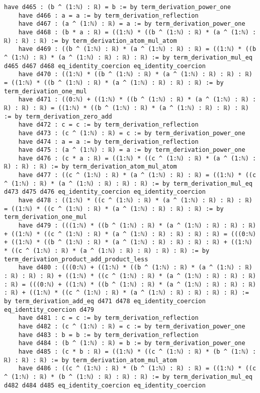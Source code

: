 \documentclass{article}
\begin{document}
\begin{tcolorbox}[colback=white!10, width=\linewidth]
\begin{lstlisting}[language=Lean4]
    have d465 : (b ^ (1:ℕ) : ℝ) = b := by term_derivation_power_one
    have d466 : a = a := by term_derivation_reflection
    have d467 : (a ^ (1:ℕ) : ℝ) = a := by term_derivation_power_one
    have d468 : (b * a : ℝ) = ((1:ℕ) * ((b ^ (1:ℕ) : ℝ) * (a ^ (1:ℕ) : ℝ) : ℝ) : ℝ) := by term_derivation_atom_mul_atom
    have d469 : ((b ^ (1:ℕ) : ℝ) * (a ^ (1:ℕ) : ℝ) : ℝ) = ((1:ℕ) * ((b ^ (1:ℕ) : ℝ) * (a ^ (1:ℕ) : ℝ) : ℝ) : ℝ) := by term_derivation_mul_eq d465 d467 d468 eq_identity_coercion eq_identity_coercion
    have d470 : ((1:ℕ) * ((b ^ (1:ℕ) : ℝ) * (a ^ (1:ℕ) : ℝ) : ℝ) : ℝ) = ((1:ℕ) * ((b ^ (1:ℕ) : ℝ) * (a ^ (1:ℕ) : ℝ) : ℝ) : ℝ) := by term_derivation_one_mul
    have d471 : ((0:ℕ) + ((1:ℕ) * ((b ^ (1:ℕ) : ℝ) * (a ^ (1:ℕ) : ℝ) : ℝ) : ℝ) : ℝ) = ((1:ℕ) * ((b ^ (1:ℕ) : ℝ) * (a ^ (1:ℕ) : ℝ) : ℝ) : ℝ) := by term_derivation_zero_add
    have d472 : c = c := by term_derivation_reflection
    have d473 : (c ^ (1:ℕ) : ℝ) = c := by term_derivation_power_one
    have d474 : a = a := by term_derivation_reflection
    have d475 : (a ^ (1:ℕ) : ℝ) = a := by term_derivation_power_one
    have d476 : (c * a : ℝ) = ((1:ℕ) * ((c ^ (1:ℕ) : ℝ) * (a ^ (1:ℕ) : ℝ) : ℝ) : ℝ) := by term_derivation_atom_mul_atom
    have d477 : ((c ^ (1:ℕ) : ℝ) * (a ^ (1:ℕ) : ℝ) : ℝ) = ((1:ℕ) * ((c ^ (1:ℕ) : ℝ) * (a ^ (1:ℕ) : ℝ) : ℝ) : ℝ) := by term_derivation_mul_eq d473 d475 d476 eq_identity_coercion eq_identity_coercion
    have d478 : ((1:ℕ) * ((c ^ (1:ℕ) : ℝ) * (a ^ (1:ℕ) : ℝ) : ℝ) : ℝ) = ((1:ℕ) * ((c ^ (1:ℕ) : ℝ) * (a ^ (1:ℕ) : ℝ) : ℝ) : ℝ) := by term_derivation_one_mul
    have d479 : (((1:ℕ) * ((b ^ (1:ℕ) : ℝ) * (a ^ (1:ℕ) : ℝ) : ℝ) : ℝ) + ((1:ℕ) * ((c ^ (1:ℕ) : ℝ) * (a ^ (1:ℕ) : ℝ) : ℝ) : ℝ) : ℝ) = (((0:ℕ) + ((1:ℕ) * ((b ^ (1:ℕ) : ℝ) * (a ^ (1:ℕ) : ℝ) : ℝ) : ℝ) : ℝ) + ((1:ℕ) * ((c ^ (1:ℕ) : ℝ) * (a ^ (1:ℕ) : ℝ) : ℝ) : ℝ) : ℝ) := by term_derivation_product_add_product_less
    have d480 : (((0:ℕ) + ((1:ℕ) * ((b ^ (1:ℕ) : ℝ) * (a ^ (1:ℕ) : ℝ) : ℝ) : ℝ) : ℝ) + ((1:ℕ) * ((c ^ (1:ℕ) : ℝ) * (a ^ (1:ℕ) : ℝ) : ℝ) : ℝ) : ℝ) = (((0:ℕ) + ((1:ℕ) * ((b ^ (1:ℕ) : ℝ) * (a ^ (1:ℕ) : ℝ) : ℝ) : ℝ) : ℝ) + ((1:ℕ) * ((c ^ (1:ℕ) : ℝ) * (a ^ (1:ℕ) : ℝ) : ℝ) : ℝ) : ℝ) := by term_derivation_add_eq d471 d478 eq_identity_coercion eq_identity_coercion d479
    have d481 : c = c := by term_derivation_reflection
    have d482 : (c ^ (1:ℕ) : ℝ) = c := by term_derivation_power_one
    have d483 : b = b := by term_derivation_reflection
    have d484 : (b ^ (1:ℕ) : ℝ) = b := by term_derivation_power_one
    have d485 : (c * b : ℝ) = ((1:ℕ) * ((c ^ (1:ℕ) : ℝ) * (b ^ (1:ℕ) : ℝ) : ℝ) : ℝ) := by term_derivation_atom_mul_atom
    have d486 : ((c ^ (1:ℕ) : ℝ) * (b ^ (1:ℕ) : ℝ) : ℝ) = ((1:ℕ) * ((c ^ (1:ℕ) : ℝ) * (b ^ (1:ℕ) : ℝ) : ℝ) : ℝ) := by term_derivation_mul_eq d482 d484 d485 eq_identity_coercion eq_identity_coercion

\end{lstlisting}
\end{tcolorbox}
\end{document}
